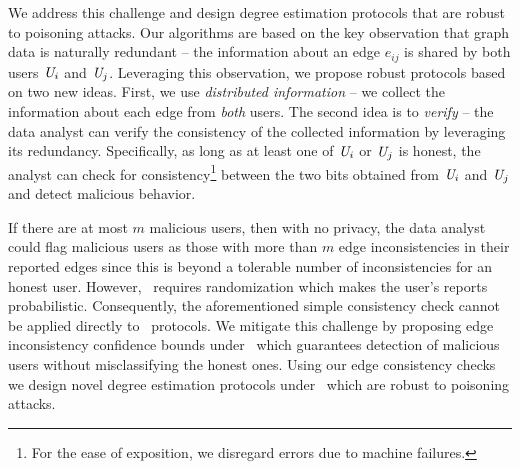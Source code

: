 We  address this challenge and design degree estimation protocols that are robust to poisoning attacks. Our algorithms are based on the key observation that graph data is naturally redundant -- the information about an edge $e_{ij}$ is shared by both users $\textit{U}_i$ and $\textit{U}_j$. Leveraging this observation, we propose robust protocols based on two new ideas. First, we use \textit{distributed information} -- we collect the information about each edge from \textit{both} users. The second idea is to \textit{verify} -- the data analyst can verify the consistency of the collected information by leveraging its redundancy. Specifically, as long as at least one of $\textit{U}_i$ or $\textit{U}_j$ is honest, the analyst can check for consistency\footnote{For the ease of exposition, we disregard errors due to machine failures.} between the two bits obtained from $\textit{U}_i$ and $\textit{U}_j$ and detect malicious behavior. 

If there are at most $m$ malicious users, then with no privacy, the data analyst could flag malicious users as those with more than $m$ edge inconsistencies in their reported edges since this is beyond a tolerable number of inconsistencies for an honest user. However, \ldp~requires randomization which makes the user's reports probabilistic. Consequently, the aforementioned simple consistency check cannot be applied directly to \ldp~protocols. We mitigate this challenge by proposing edge inconsistency confidence bounds under \ldp~which guarantees detection of malicious users without misclassifying the honest ones. Using our edge consistency checks we design novel degree estimation protocols under \ldp~which are robust to poisoning attacks.

 






